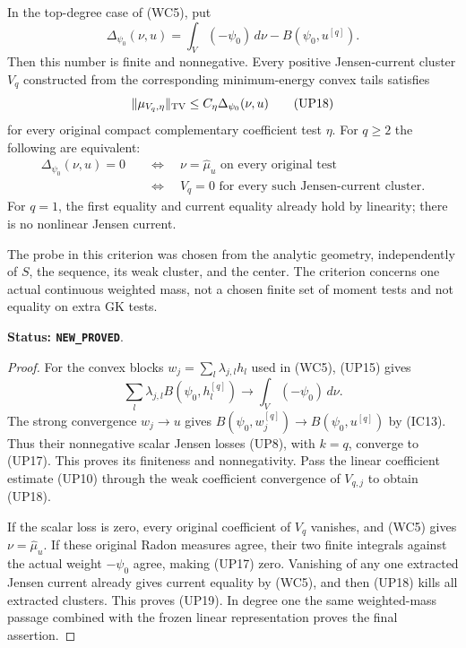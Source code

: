 \begin{theorem}
\label{thm:r12-single-moment-no-defect}
In the top-degree case of (WC5), put
\[
 \Delta_{\psi_0}(\nu,u)
      =\int_V(-\psi_0)\,d\nu-B(\psi_0,u^{[q]}).
 \tag{UP17}
\]
Then this number is finite and nonnegative.  Every positive
Jensen-current cluster $V_q$ constructed from the corresponding
minimum-energy convex tails satisfies
\[
                    \|\mu_{V_q,\eta}\|_{\rm TV}
                           \leq C_\eta\Delta_{\psi_0}(\nu,u)
 \tag{UP18}
\]
for every original compact complementary coefficient test $\eta$.
For $q\geq2$ the following are equivalent:
\[
 \begin{split}
 \Delta_{\psi_0}(\nu,u)=0
 &\quad\Longleftrightarrow\quad \nu=\widehat\mu_u
                  \text{ on every original test}\\
 &\quad\Longleftrightarrow\quad V_q=0
                  \text{ for every such Jensen-current cluster}.
 \end{split}
 \tag{UP19}
\]
For $q=1$, the first equality and current equality already hold
by linearity; there is no nonlinear Jensen current.

The probe in this criterion was chosen from the analytic geometry,
independently of $S$, the sequence, its weak cluster, and the center.
The criterion concerns one actual continuous weighted mass, not a
chosen finite set of moment tests and not equality on extra GK tests.
\end{theorem}

\noindent\textbf{Status: \texttt{NEW\_PROVED}}.

\begin{proof}
For the convex blocks $w_j=\sum_l\lambda_{j,l}h_l$ used in
(WC5), (UP15) gives
\[
 \sum_l\lambda_{j,l}B(\psi_0,h_l^{[q]})
                      \longrightarrow\int_V(-\psi_0)\,d\nu.
\]
The strong convergence $w_j\to u$ gives
$B(\psi_0,w_j^{[q]})\to B(\psi_0,u^{[q]})$ by (IC13).
Thus their nonnegative scalar Jensen losses (UP8), with $k=q$,
converge to (UP17).  This proves its finiteness and nonnegativity.
Pass the linear coefficient estimate (UP10) through the weak
coefficient convergence of $V_{q,j}$ to obtain (UP18).

If the scalar loss is zero, every original coefficient of $V_q$
vanishes, and (WC5) gives $\nu=\widehat\mu_u$.  If these original
Radon measures agree, their two finite integrals against the
actual weight $-\psi_0$ agree, making (UP17) zero.  Vanishing of
any one extracted Jensen current already gives current equality
by (WC5), and then (UP18) kills all extracted clusters.  This
proves (UP19).  In degree one the same weighted-mass passage
combined with the frozen linear representation proves the final
assertion.
\end{proof}

